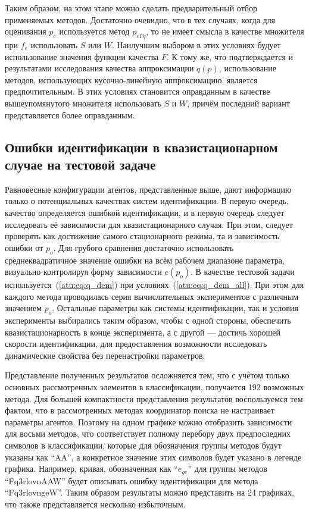 Таким образом, на этом этапе можно сделать предварительный отбор
применяемых методов. Достаточно очевидно,
что в тех случаях, когда для оценивания $p_e$
используется метод $p_{eFq}$, то не имеет смысла
в качестве множителя при $f_e$ использовать $S$ или $W$.
Наилучшим выбором в этих условиях будует использование
значения функции качества $F$. К тому же,
что подтверждается и результатами исследования качества аппроксимации $q(p)$,
использование методов, использующих кусочно-линейную аппроксимацию,
является предпочтительным. В этих условиях
становится оправданным в качестве вышеупомянутого множителя
использовать $S$ и $W$, причём последний вариант представляется более оправданным.



\subsection{Ошибки идентификации в квазистационарном случае на тестовой задаче}  %

Равновесные конфигурации агентов, представленные выше,
дают информацию только о потенциальных качествах систем идентификации.
В первую очередь, качество определяется ошибкой идентификации,
и в первую очередь следует исследовать её зависимости для квазистационарного случая.
При этом, следует проверять как достижение самого стационарного режима,
та и зависимость ошибки от $p_o$. Для грубого сравнения достаточно
использовать среднеквадратичное значение ошибки на всём рабочем диапазоне параметра,
визуально контролируя форму зависимости $e(p_o)$.
В качестве тестовой задачи используется~(\ref{atu:eq:q_dem})
при условиях~(\ref{atu:eq:q_dem_all}). При этом для каждого метода
проводилась серия вычислительных экспериментов с различным значением $p_o$.
Остальные параметры как системы идентификации, так и условия эксперименты выбирались
таким образом, чтобы с одной стороны, обеспечить квазистационарность
в конце эксперимента, а с другой --- достичь хорошей скорости
идентификации, для предоставления возможности исследовать динамические свойства
без перенастройки параметров.

Представление полученных результатов осложняется тем, что
с учётом только основных рассмотренных элементов
в классификации, получается 192 возможных метода.
Для большей компактности представления результатов
воспользуемся тем фактом, что в рассмотренных методах
координатор поиска не настраивает параметры агентов.
Поэтому на одном графике можно отобразить зависимости
для восьми методов, что соответствует полному перебору
двух предпоследних символов в классификации,
которые для обозначения группы методов будут
указаны как ``AA'', а конкретное значение этих символов
будет указано в легенде графика. Например,
кривая, обозначенная как ``$e_{ge}$'' для группы методов
``Fq3rlovnAAW'' будет описывать
ошибку идентификации для метода ``Fq3rlovngeW''.
Таким образом результаты можно представить на 24 графиках,
что также представляется несколько избыточным.

